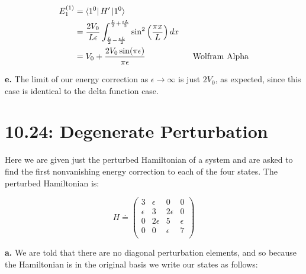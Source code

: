 \documentclass[10pt]{article} %
\begin{document}
\begin{align*}
  E_1^{(1)} &= \bra{1^0}H'\ket{1^0}\\
  &= \frac{2V_0}{L\epsilon}
  \int_{\frac{L}{2}-\frac{\epsilon L}{2}}^{\frac{L}{2}+\frac{\epsilon L}{2}}
  \sin^2\left(\frac{\pi x}{L}\right)dx\\
  &= V_0 + \frac{2V_0\sin(\pi\epsilon)}{\pi\epsilon}
  \hspace{2cm}\mbox{Wolfram Alpha}\\
\end{align*}

\textbf{e.}
The limit of our energy correction as $\epsilon\rightarrow\infty$ is just $2V_0$,
as expected, since this case is identical to the delta function case.\\

\section{10.24: Degenerate Perturbation}
Here we are given just the perturbed Hamiltonian of a system and are asked to find the first
nonvanishing energy correction to each of the four states. The perturbed Hamiltonian is:

\begin{equation*}
  H \doteq
  \begin{pmatrix}
    3 & \epsilon & 0 & 0\\
    \epsilon & 3 & 2\epsilon & 0\\
    0 & 2\epsilon & 5 & \epsilon\\
    0 & 0 & \epsilon & 7\\
  \end{pmatrix}
\end{equation*}

\textbf{a.}
We are told that there are no diagonal perturbation elements, and so because the Hamiltonian is in
the original basis we write our states as follows:
\end{document}
